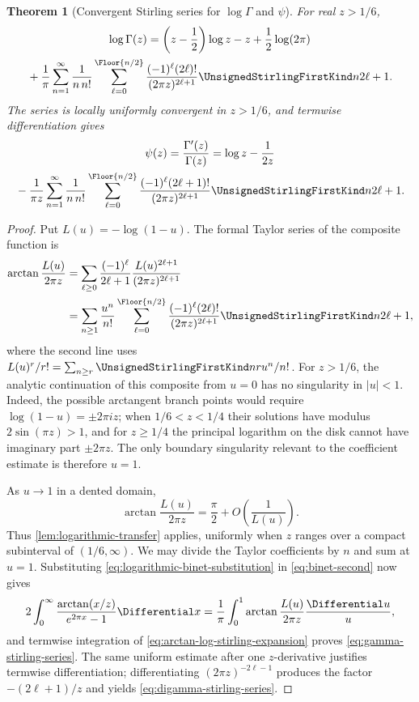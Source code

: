\documentclass[11pt,a4paper,oneside,openany]{book}
\newtheorem{theorem}{Theorem}[chapter]
\theoremstyle{definition}
\theoremstyle{remark}
\begin{document}
\begin{theorem}[Convergent Stirling series for $\log\Gamma$ and $\psi$]
\label{thm:gamma-stirling-series}
For real $z>1/6$,
\begin{multline}
\label{eq:gamma-stirling-series}
 \log\Gamma(z)
 =\left(z-\frac12\right)\log z-z+\frac12\log(2\pi)\\
 {}+\frac1\pi\sum_{n=1}^{\infty}\frac1{n\,n!}
 \sum_{\ell=0}^{\Floor{n/2}}
 \frac{(-1)^\ell(2\ell)!}{(2\pi z)^{2\ell+1}}
 \UnsignedStirlingFirstKind n{2\ell+1}.
\end{multline}
The series is locally uniformly convergent in $z>1/6$, and termwise
differentiation gives
\begin{multline}
\label{eq:digamma-stirling-series}
 \psi(z)=\frac{\Gamma'(z)}{\Gamma(z)}
 =\log z-\frac1{2z}\\
 {}-\frac1{\pi z}\sum_{n=1}^{\infty}\frac1{n\,n!}
 \sum_{\ell=0}^{\Floor{n/2}}
 \frac{(-1)^\ell(2\ell+1)!}{(2\pi z)^{2\ell+1}}
 \UnsignedStirlingFirstKind n{2\ell+1}.
\end{multline}
\end{theorem}
\begin{proof}
Put $L(u)=-\log(1-u)$.  The formal Taylor series of the composite function is
\begin{align}
 \arctan\frac{L(u)}{2\pi z}
 &=\sum_{\ell\ge0}\frac{(-1)^\ell}{2\ell+1}
   \frac{L(u)^{2\ell+1}}{(2\pi z)^{2\ell+1}}\notag\\
 &=\sum_{n\ge1}\frac{u^n}{n!}
   \sum_{\ell=0}^{\Floor{n/2}}
   \frac{(-1)^\ell(2\ell)!}{(2\pi z)^{2\ell+1}}
   \UnsignedStirlingFirstKind n{2\ell+1},
 \label{eq:arctan-log-stirling-expansion}
\end{align}
where the second line uses
$L(u)^r/r!=\sum_{n\ge r}\UnsignedStirlingFirstKind nr u^n/n!$.
For $z>1/6$, the analytic continuation of this composite from $u=0$ has no
singularity in $|u|<1$.  Indeed, the possible arctangent branch points would
require $\log(1-u)=\pm2\pi iz$; when $1/6<z<1/4$ their solutions have modulus
$2\sin(\pi z)>1$, and for $z\ge1/4$ the principal logarithm on the disk cannot
have imaginary part $\pm2\pi z$.  The only boundary singularity relevant to the
coefficient estimate is therefore $u=1$.

As $u\to1$ in a dented domain,
\[
 \arctan\frac{L(u)}{2\pi z}
 =\frac\pi2+O\!\left(\frac1{L(u)}\right).
\]
Thus \cref{lem:logarithmic-transfer} applies, uniformly when $z$ ranges over a
compact subinterval of $(1/6,\infty)$.  We may divide the Taylor coefficients by
$n$ and sum at $u=1$.  Substituting \eqref{eq:logarithmic-binet-substitution} in
\eqref{eq:binet-second} now gives
\[
 2\int_0^\infty\frac{\arctan(x/z)}{e^{2\pi x}-1}\Differential x
 =\frac1\pi\int_0^1\arctan\frac{L(u)}{2\pi z}\frac{\Differential u}{u},
\]
and termwise integration of
\eqref{eq:arctan-log-stirling-expansion} proves
\eqref{eq:gamma-stirling-series}.  The same uniform estimate after one
$z$-derivative justifies termwise differentiation; differentiating
$(2\pi z)^{-2\ell-1}$ produces the factor $-(2\ell+1)/z$ and yields
\eqref{eq:digamma-stirling-series}.
\end{proof}
\end{document}
